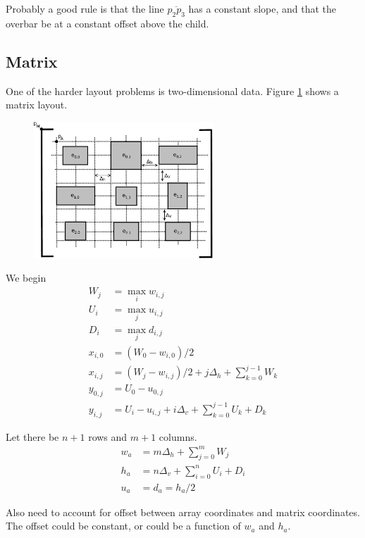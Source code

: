 \documentclass[12pt]{article}
\begin{document}
Probably a good rule is that the line $\overline{p_2p_3}$ has a constant slope, and that the overbar be at a constant offset above the child.

\subsection{Matrix}

One of the harder layout problems is two-dimensional data. Figure \ref{fig:layout_matrix} shows a matrix layout.

\begin{figure}[ht]
	\centering
		\includegraphics[width=0.6\textwidth]{Fig/LayoutMatrix.pdf}
	\caption{}
	\label{fig:layout_matrix}
\end{figure}

We begin
\begin{align*}
W_j &= \max_i w_{i,j} \\
U_i &= \max_j u_{i,j} \\
D_i &= \max_j d_{i,j} \\
x_{i,0} &= (W_0 - w_{i,0})/2 \\
x_{i,j} &= (W_j - w_{i,j})/2 + j\Delta_h + \sum_{k=0}^{j-1} W_k \\
y_{0,j} &= U_0 - u_{0,j} \\
y_{i,j} &= U_i - u_{i,j} + i\Delta_v + \sum_{k=0}^{j-1} U_k + D_k
\end{align*}

Let there be $n+1$ rows and $m+1$ columns.
\begin{align*}
w_a &= m\Delta_h + \sum_{j=0}^m W_j \\
h_a &= n\Delta_v + \sum_{i=0}^n U_i + D_i \\
u_a &= d_a = h_a / 2
\end{align*}

Also need to account for offset between array coordinates and matrix coordinates. The offset could be constant, or could be a function of $w_a$ and $h_a$.
\end{document}
